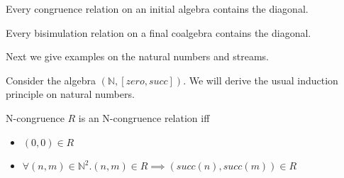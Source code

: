 \begin{thm}
	Every congruence relation on an initial algebra contains the diagonal.
\end{thm}

\begin{thm}
	Every bisimulation relation on a final coalgebra contains the diagonal.
\end{thm}


Next we give examples on the natural numbers and streams.

Consider the algebra $(\mathbb{N},[zero,succ])$. We will derive the usual induction principle on natural numbers.

\begin{lem}{N-congruence}
	$R$ is an N-congruence relation iff 
	\begin{itemize}
		\item $(0,0) \in R$
		\item $\forall (n,m) \in \mathbb{N}^2. (n,m) \in R \implies (succ(n),succ(m)) \in R$
	\end{itemize}
\end{lem}

